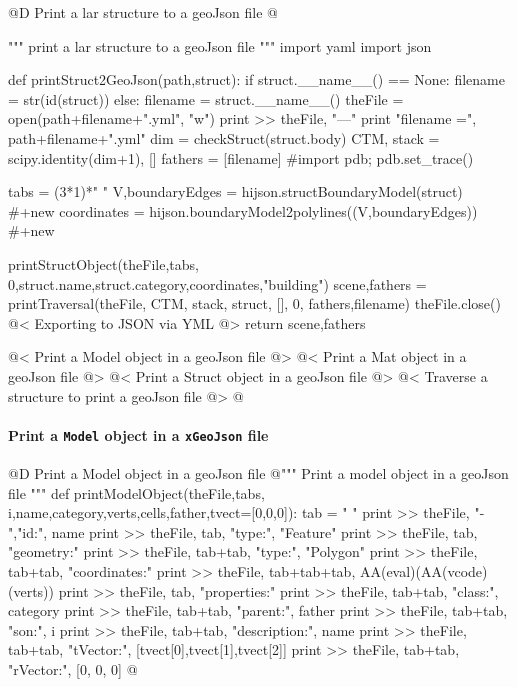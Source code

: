 \documentclass[11pt,oneside]{article}	%
\begin{document}
@D Print a lar structure to a geoJson file
@{""" print a lar structure to a geoJson file """
import yaml
import json

def printStruct2GeoJson(path,struct):
    if struct.__name__() == None:
        filename = str(id(struct))
    else: 
        filename = struct.__name__()
    theFile = open(path+filename+".yml", "w")
    print >> theFile, "---"
    print "filename =", path+filename+".yml"
    dim = checkStruct(struct.body)
    CTM, stack = scipy.identity(dim+1), []
    fathers = [filename]
    #import pdb; pdb.set_trace()

    tabs = (3*1)*" "
    V,boundaryEdges = hijson.structBoundaryModel(struct)   #+new
    coordinates = hijson.boundaryModel2polylines((V,boundaryEdges))  #+new

    printStructObject(theFile,tabs, 0,struct.name,struct.category,coordinates,"building")
    scene,fathers = printTraversal(theFile, CTM, stack, struct, [], 0, fathers,filename) 
    theFile.close()
    @< Exporting to JSON via YML @>
    return scene,fathers

@< Print a Model object in a geoJson file @>
@< Print a Mat object in a geoJson file @>
@< Print a Struct object in a geoJson file @>
@< Traverse a structure to print a geoJson file @>
@}

\paragraph{Print a \texttt{Model} object in a \texttt{xGeoJson} file}

@D Print a Model object in a geoJson file
@{""" Print a model object in a geoJson file """
def printModelObject(theFile,tabs, i,name,category,verts,cells,father,tvect=[0,0,0]):
    tab = "    "
    print >> theFile, "-   ","id:", name
    print >> theFile, tab, "type:", "Feature"
    print >> theFile, tab, "geometry:" 
    print >> theFile, tab+tab, "type:", "Polygon"
    print >> theFile, tab+tab, "coordinates:" 
    print >> theFile, tab+tab+tab, AA(eval)(AA(vcode)(verts))
    print >> theFile, tab, "properties:"
    print >> theFile, tab+tab, "class:", category
    print >> theFile, tab+tab, "parent:", father
    print >> theFile, tab+tab, "son:", i
    print >> theFile, tab+tab, "description:", name
    print >> theFile, tab+tab, "tVector:", [tvect[0],tvect[1],tvect[2]]
    print >> theFile, tab+tab, "rVector:", [0, 0, 0]
@}
\end{document}
